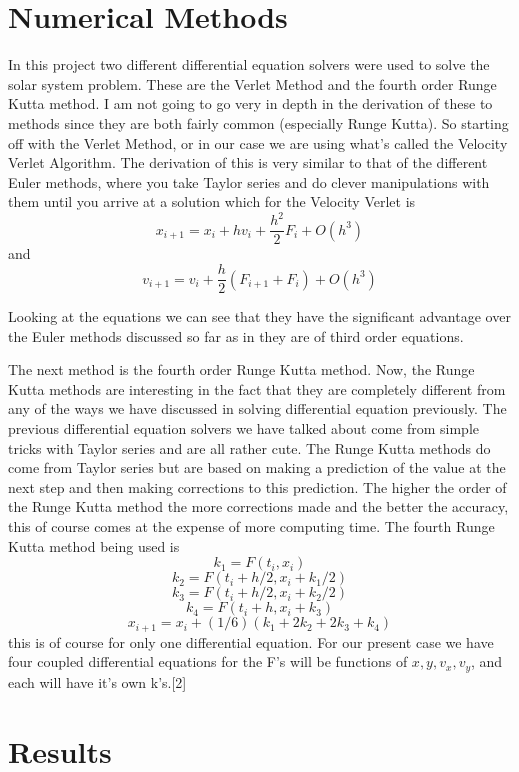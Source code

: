 \documentclass[12pt,righttag]{article}
\begin{document}
\section{Numerical Methods}
In this project two different differential equation solvers were used to solve the solar system problem. These are the Verlet Method and the fourth order Runge Kutta method. I am not going to go very in depth in the derivation of these to methods since they are both fairly common (especially Runge Kutta). So starting off with the Verlet Method, or in our case we are using what's called the Velocity Verlet Algorithm. The derivation of this is very similar to that of the different Euler methods, where you take Taylor series and do clever manipulations with them until you arrive at a solution which for the Velocity Verlet is 
\[x_{i+1}=x_i+hv_i+\frac{h^2}{2}F_i+O(h^3)\]
and
\[v_{i+1}=v_i+\frac{h}{2}(F_{i+1}+F_i)+O(h^3)\]

Looking at the equations we can see that they have the significant advantage over the Euler methods discussed so far as in they are of third order equations.


The next method is the fourth order Runge Kutta method. Now, the Runge Kutta methods are interesting in the fact that they are completely different from any of the ways we have discussed in solving differential equation previously. The previous differential equation solvers we have talked about come from simple tricks with Taylor series and are all rather cute. The Runge Kutta methods do come from Taylor series but are based on making a prediction of the value at the next step and then making corrections to this prediction. The higher the order of the Runge Kutta method the more corrections made and the better the accuracy, this of course comes at the expense of more computing time. The fourth Runge Kutta method being used is 
\[k_1=F(t_i,x_i)\]
\[k_2=F(t_i+h/2,x_i+k_1/2)\]
\[k_3=F(t_i+h/2, x_i+k_2/2)\]
\[k_4=F(t_i+h, x_i+k_3)\]
\[x_{i+1}=x_i+(1/6)(k_1+2k_2+2k_3+k_4)\]
this is of course for only one differential equation. For our present case we have four coupled differential equations for the F's will be functions of $x, y,v_x,v_y$, and each will have it's own k's.[2]





\section{Results}
\end{document}

